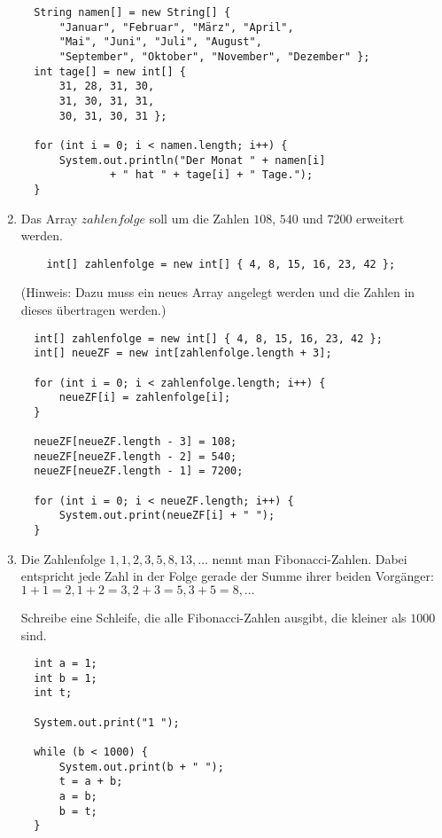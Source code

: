 \documentclass[final,a4paper]{article}
\begin{document}
\begin{enumerate}
{	\begin{lstlisting}
  String namen[] = new String[] {
	  "Januar", "Februar", "März", "April",
	  "Mai", "Juni", "Juli", "August",
	  "September", "Oktober", "November", "Dezember" };
  int tage[] = new int[] {
	  31, 28, 31, 30,
	  31, 30, 31, 31,
	  30, 31, 30, 31 };

  for (int i = 0; i < namen.length; i++) {
	  System.out.println("Der Monat " + namen[i]
			  + " hat " + tage[i] + " Tage.");
  }
	\end{lstlisting}
	}
  \item{
	Das Array $zahlenfolge$ soll um die Zahlen $108$, $540$ und $7200$ erweitert werden.
	\begin{lstlisting}
	int[] zahlenfolge = new int[] { 4, 8, 15, 16, 23, 42 };
	\end{lstlisting}
	(Hinweis: Dazu muss ein neues Array angelegt werden und die Zahlen in dieses übertragen werden.)

	\begin{lstlisting}
  int[] zahlenfolge = new int[] { 4, 8, 15, 16, 23, 42 };
  int[] neueZF = new int[zahlenfolge.length + 3];

  for (int i = 0; i < zahlenfolge.length; i++) {
	  neueZF[i] = zahlenfolge[i];
  }

  neueZF[neueZF.length - 3] = 108;
  neueZF[neueZF.length - 2] = 540;
  neueZF[neueZF.length - 1] = 7200;

  for (int i = 0; i < neueZF.length; i++) {
	  System.out.print(neueZF[i] + " ");
  }
	\end{lstlisting}
	}
  \item{
	Die Zahlenfolge $1, 1, 2, 3, 5, 8, 13, \ldots$ nennt man Fibonacci-Zahlen. Dabei entspricht jede Zahl
	in der Folge gerade der Summe ihrer beiden Vorgänger: $1+1=2, 1+2=3, 2+3=5, 3+5=8, \ldots$

	Schreibe eine Schleife, die alle Fibonacci-Zahlen ausgibt, die kleiner als $1000$ sind.

	\begin{lstlisting}
  int a = 1;
  int b = 1;
  int t;

  System.out.print("1 ");

  while (b < 1000) {
	  System.out.print(b + " ");
	  t = a + b;
	  a = b;
	  b = t;
  }
	\end{lstlisting}
	}
\end{enumerate}
\end{document}
